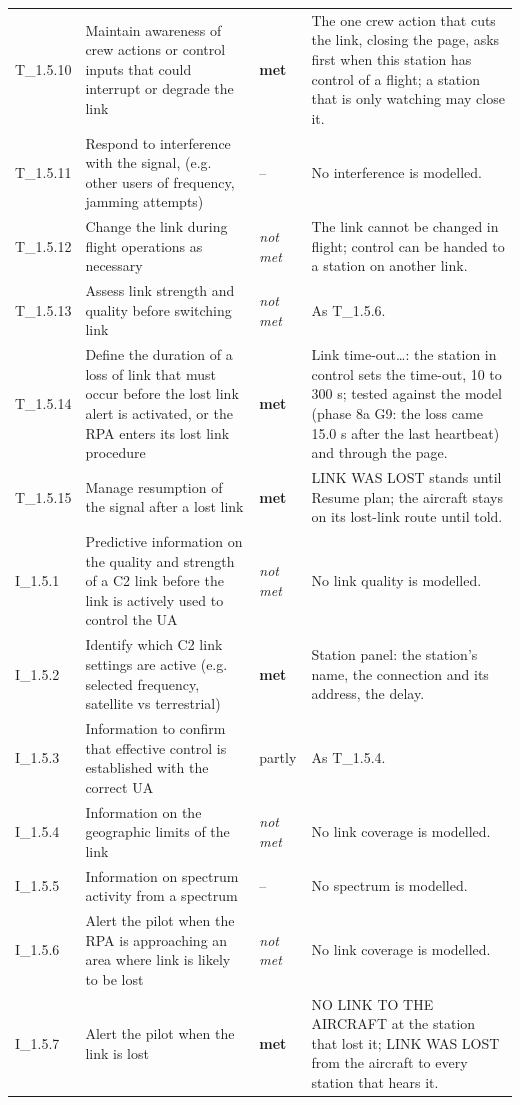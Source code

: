 \begin{longtable}{@{}>{\raggedright\arraybackslash}p{12mm}>{\raggedright\arraybackslash}p{57mm}>{\raggedright\arraybackslash}p{13mm}>{\raggedright\arraybackslash}p{70mm}@{}}
T\_1.5.10 & Maintain awareness of crew actions or control inputs that could interrupt or degrade the link & \textbf{met} & The one crew action that cuts the link, closing the page, asks first when this station has control of a flight; a station that is only watching may close it. \\
T\_1.5.11 & Respond to interference with the signal, (e.g. other users of frequency, jamming attempts) & -- & No interference is modelled. \\
T\_1.5.12 & Change the link during flight operations as necessary & \emph{not met} & The link cannot be changed in flight; control can be handed to a station on another link. \\
T\_1.5.13 & Assess link strength and quality before switching link & \emph{not met} & As T\_1.5.6. \\
T\_1.5.14 & Define the duration of a loss of link that must occur before the lost link alert is activated, or the RPA enters its lost link procedure & \textbf{met} & Link time-out\ldots{}: the station in control sets the time-out, 10 to 300 s; tested against the model (phase 8a G9: the loss came 15.0 s after the last heartbeat) and through the page. \\
T\_1.5.15 & Manage resumption of the signal after a lost link & \textbf{met} & LINK WAS LOST stands until Resume plan; the aircraft stays on its lost-link route until told. \\
I\_1.5.1 & Predictive information on the quality and strength of a C2 link before the link is actively used to control the UA & \emph{not met} & No link quality is modelled. \\
I\_1.5.2 & Identify which C2 link settings are active (e.g. selected frequency, satellite vs terrestrial) & \textbf{met} & Station panel: the station's name, the connection and its address, the delay. \\
I\_1.5.3 & Information to confirm that effective control is established with the correct UA & partly & As T\_1.5.4. \\
I\_1.5.4 & Information on the geographic limits of the link & \emph{not met} & No link coverage is modelled. \\
I\_1.5.5 & Information on spectrum activity from a spectrum & -- & No spectrum is modelled. \\
I\_1.5.6 & Alert the pilot when the RPA is approaching an area where link is likely to be lost & \emph{not met} & No link coverage is modelled. \\
I\_1.5.7 & Alert the pilot when the link is lost & \textbf{met} & NO LINK TO THE AIRCRAFT at the station that lost it; LINK WAS LOST from the aircraft to every station that hears it. \\

\end{longtable}
